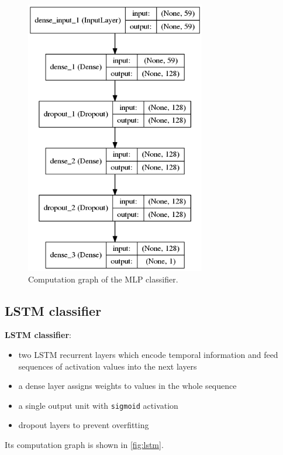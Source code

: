 \documentclass[11pt,a4paper]{report}
\begin{document}
\begin{figure}[htbp]
  \centering
  \includegraphics[width=0.7\textwidth]{model-mlp.png}
  \caption{Computation graph of the MLP classifier.} \label{fig:mlp}
\end{figure}

\subsection{LSTM classifier}

\begin{mdframed}
\noindent \textbf{LSTM classifier}:
\begin{itemize}
  \item two LSTM recurrent layers which encode temporal information and feed sequences of activation values into the next layers
  \item a dense layer assigns weights to values in the whole sequence
  \item a single output unit with \texttt{sigmoid} activation
  \item dropout layers to prevent overfitting
\end{itemize}
\end{mdframed}

Its computation graph is shown in \autoref{fig:lstm}.
\end{document}
